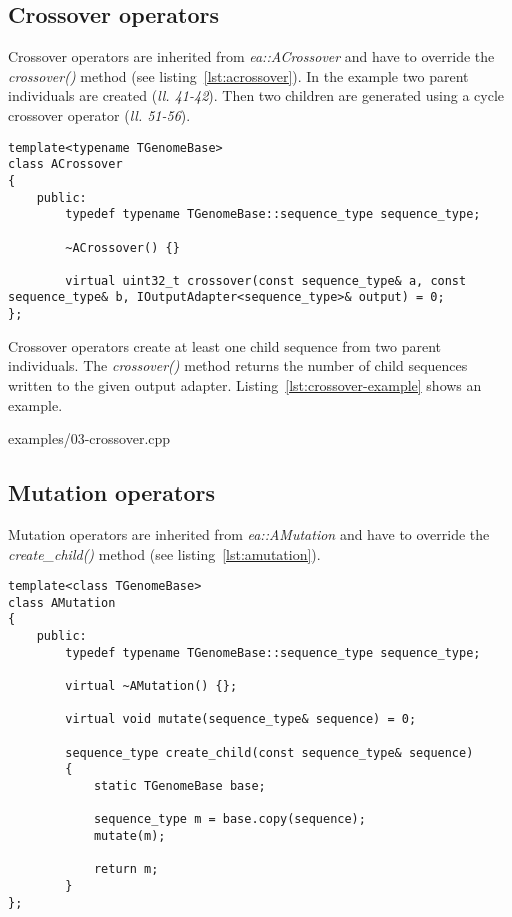 \documentclass[a4paper]{article}
\begin{document}
\subsection{Crossover operators}

Crossover operators are inherited from \textit{ea::ACrossover} and have to override the \textit{crossover()} method (see listing~\ref{lst:acrossover}). In the example two parent individuals are created (\textit{ll. 41-42}). Then two children are generated using a cycle crossover operator (\textit{ll. 51-56}). 

\begin{lstlisting}[caption=ACrossover,label=lst:acrossover]
template<typename TGenomeBase>
class ACrossover
{
	public:
		typedef typename TGenomeBase::sequence_type sequence_type;

		~ACrossover() {}

		virtual uint32_t crossover(const sequence_type& a, const sequence_type& b, IOutputAdapter<sequence_type>& output) = 0;
};
\end{lstlisting}

Crossover operators create at least one child sequence from two parent individuals. The \textit{crossover()} method returns the number of child sequences written to the given output adapter. Listing~\ref{lst:crossover-example} shows an example.

\begin{lstinputlisting}[caption=crossover operators,label=lst:crossover-example]{examples/03-crossover.cpp}
\end{lstinputlisting}

\subsection{Mutation operators}

Mutation operators are inherited from \textit{ea::AMutation} and have to override the \textit{create\_child()} method (see listing~\ref{lst:amutation}). 

\begin{lstlisting}[caption=AMutation,label=lst:amutation]
template<class TGenomeBase>
class AMutation
{
	public:
		typedef typename TGenomeBase::sequence_type sequence_type;

		virtual ~AMutation() {};

		virtual void mutate(sequence_type& sequence) = 0;

		sequence_type create_child(const sequence_type& sequence)
		{
			static TGenomeBase base;

			sequence_type m = base.copy(sequence);
			mutate(m);

			return m;
		}
};
\end{lstlisting}
\end{document}
